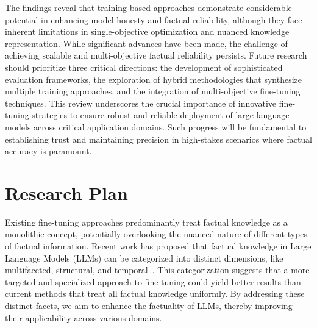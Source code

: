 \documentclass{article}
\begin{document}
The findings reveal that training-based approaches demonstrate considerable potential in enhancing model honesty and factual reliability, although they face inherent limitations in single-objective optimization and nuanced knowledge representation. While significant advances have been made, the challenge of achieving scalable and multi-objective factual reliability persists. Future research should prioritize three critical directions: the development of sophisticated evaluation frameworks, the exploration of hybrid methodologies that synthesize multiple training approaches, and the integration of multi-objective fine-tuning techniques. This review underscores the crucial importance of innovative fine-tuning strategies to ensure robust and reliable deployment of large language models across critical application domains. Such progress will be fundamental to establishing trust and maintaining precision in high-stakes scenarios where factual accuracy is paramount.

\clearpage

\section{Research Plan}
Existing fine-tuning approaches predominantly treat factual knowledge as a monolithic concept, potentially overlooking the nuanced nature of different types of factual information. Recent work has proposed that factual knowledge in Large Language Models (LLMs) can be categorized into distinct dimensions, like multifaceted, structural, and temporal~\cite{UNDERSTANDINGFACTUALKNOWLEDGELARGELANGUAGE2024a}. This categorization suggests that a more targeted and specialized approach to fine-tuning could yield better results than current methods that treat all factual knowledge uniformly. By addressing these distinct facets, we aim to enhance the factuality of LLMs, thereby improving their applicability across various domains.
\end{document}
